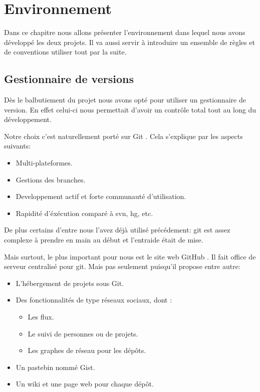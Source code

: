 \chapter{Environnement}
    Dans ce chapitre nous allons présenter l'environnement dans lequel nous avons
    développé les deux projets. Il va aussi servir à introduire un ensemble de
    règles et de conventions utiliser tout par la suite.

\newpage

    \section{Gestionnaire de versions}
        Dès le balbutiement du projet nous avons opté pour utiliser un gestionnaire
    de version. En effet celui-ci nous permettait d'avoir un contrôle total tout
    au long du développement.

    Notre choix c'est naturellement porté sur Git \cite{git}. Cela s'explique 
    par les aspects suivants:

    \begin{itemize}
    \item Multi-plateformes.
    \item Gestions des branches.
    \item Developpement actif et forte communauté d'utilisation.
    \item Rapidité d'éxécution comparé à svn, hg, etc. 
    \end{itemize}

    De plus certains d'entre nous l'avez déjà utilisé précédement: git est assez
    complexe à prendre en main au début et l'entraide était de mise.

    Mais surtout, le plus important pour nous est le site web GitHub \cite{github}.
    Il fait office de serveur centralisé pour git. Mais pas seulement puisqu'il 
    propose entre autre:

    \begin{itemize}
    \item L'hébergement de projets sous Git.
    \item Des fonctionnalités de type réseaux sociaux, dont :
        \begin{itemize}
        \item Les flux.
        \item Le suivi de personnes ou de projets.
        \item Les graphes de réseau pour les dépôts.
        \end{itemize}
    \item Un pastebin nommé Gist.
    \item Un wiki et une page web pour chaque dépôt.
    \end{itemize}

